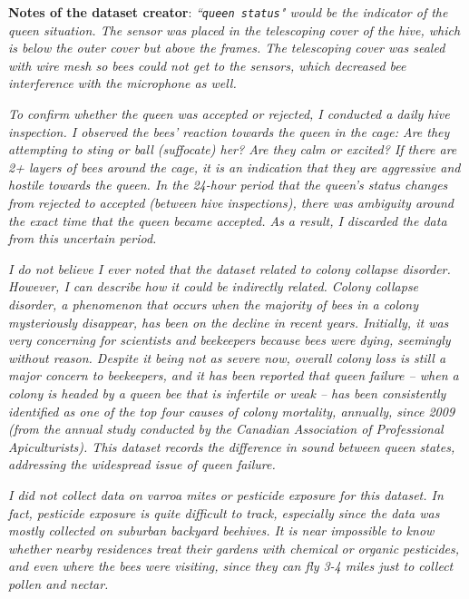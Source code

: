 \documentclass[12pt]{report}
\begin{document}
\par\textbf{Notes of the dataset creator}: \textit{``{\tt queen status}" would be the indicator of the queen situation. The sensor was placed in the telescoping cover of the hive, which is below the outer cover but above the frames. The telescoping cover was sealed with wire mesh so bees could not get to the sensors, which decreased bee interference with the microphone as well.}

\par\textit{To confirm whether the queen was accepted or rejected, I conducted a daily hive inspection. I observed the bees’ reaction towards the queen in the cage: Are they attempting to sting or ball (suffocate) her? Are they calm or excited? If there are 2+ layers of bees around the cage, it is an indication that they are aggressive and hostile towards the queen. In the 24-hour period that the queen’s status changes from rejected to accepted (between hive inspections), there was ambiguity around the exact time that the queen became accepted. As a result, I discarded the data from this uncertain period.}

\par\textit{I do not believe I ever noted that the dataset related to colony collapse disorder. However, I can describe how it could be indirectly related. Colony collapse disorder, a phenomenon that occurs when the majority of bees in a colony mysteriously disappear, has been on the decline in recent years. Initially, it was very concerning for scientists and beekeepers because bees were dying, seemingly without reason. Despite it being not as severe now, overall colony loss is still a major concern to beekeepers, and it has been reported that queen failure -- when a colony is headed by a queen bee that is infertile or weak -- has been consistently identified as one of the top four causes of colony mortality, annually, since 2009 (from the annual study conducted by the Canadian Association of Professional Apiculturists). This dataset records the difference in sound between queen states, addressing the widespread issue of queen failure.}

\par\textit{I did not collect data on varroa mites or pesticide exposure for this dataset. In fact, pesticide exposure is quite difficult to track, especially since the data was mostly collected on suburban backyard beehives. It is near impossible to know whether nearby residences treat their gardens with chemical or organic pesticides, and even where the bees were visiting, since they can fly 3-4 miles just to collect pollen and nectar.}

\pagebreak
{}
\printbibliography
\thispagestyle{empty}
\end{document}
